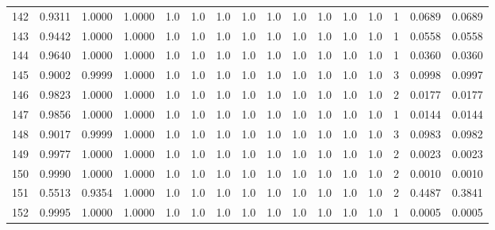 \begin{tabular}{lrrrrrrrrrrrrrrr}
142 &      0.9311 &  1.0000 &  1.0000 &     1.0 &     1.0 &     1.0 &     1.0 &     1.0 &     1.0 &     1.0 &      1.0 &        1.0 &      1 &                    0.0689 &                     0.0689 \\
143 &      0.9442 &  1.0000 &  1.0000 &     1.0 &     1.0 &     1.0 &     1.0 &     1.0 &     1.0 &     1.0 &      1.0 &        1.0 &      1 &                    0.0558 &                     0.0558 \\
144 &      0.9640 &  1.0000 &  1.0000 &     1.0 &     1.0 &     1.0 &     1.0 &     1.0 &     1.0 &     1.0 &      1.0 &        1.0 &      1 &                    0.0360 &                     0.0360 \\
145 &      0.9002 &  0.9999 &  1.0000 &     1.0 &     1.0 &     1.0 &     1.0 &     1.0 &     1.0 &     1.0 &      1.0 &        1.0 &      3 &                    0.0998 &                     0.0997 \\
146 &      0.9823 &  1.0000 &  1.0000 &     1.0 &     1.0 &     1.0 &     1.0 &     1.0 &     1.0 &     1.0 &      1.0 &        1.0 &      2 &                    0.0177 &                     0.0177 \\
147 &      0.9856 &  1.0000 &  1.0000 &     1.0 &     1.0 &     1.0 &     1.0 &     1.0 &     1.0 &     1.0 &      1.0 &        1.0 &      1 &                    0.0144 &                     0.0144 \\
148 &      0.9017 &  0.9999 &  1.0000 &     1.0 &     1.0 &     1.0 &     1.0 &     1.0 &     1.0 &     1.0 &      1.0 &        1.0 &      3 &                    0.0983 &                     0.0982 \\
149 &      0.9977 &  1.0000 &  1.0000 &     1.0 &     1.0 &     1.0 &     1.0 &     1.0 &     1.0 &     1.0 &      1.0 &        1.0 &      2 &                    0.0023 &                     0.0023 \\
150 &      0.9990 &  1.0000 &  1.0000 &     1.0 &     1.0 &     1.0 &     1.0 &     1.0 &     1.0 &     1.0 &      1.0 &        1.0 &      2 &                    0.0010 &                     0.0010 \\
151 &      0.5513 &  0.9354 &  1.0000 &     1.0 &     1.0 &     1.0 &     1.0 &     1.0 &     1.0 &     1.0 &      1.0 &        1.0 &      2 &                    0.4487 &                     0.3841 \\
152 &      0.9995 &  1.0000 &  1.0000 &     1.0 &     1.0 &     1.0 &     1.0 &     1.0 &     1.0 &     1.0 &      1.0 &        1.0 &      1 &                    0.0005 &                     0.0005 \\

\end{tabular}
